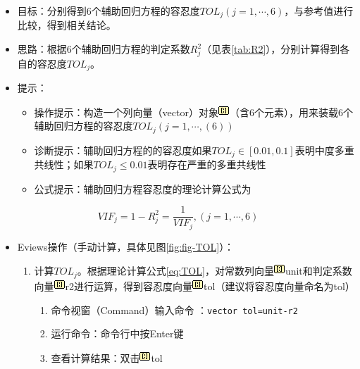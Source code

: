\documentclass[12pt,(landscape,a4paper),(portrait,a4paper)]{article}
\providecommand{\tightlist}{%
  \setlength{\itemsep}{0pt}\setlength{\parskip}{0pt}}
\begin{document}
\begin{itemize}
\tightlist
\item
  目标：分别得到6个辅助回归方程的容忍度\(TOL_j(j=1,\cdots,6)\)，与参考值进行比较，得到相关结论。\\
\item
  思路：根据6个辅助回归方程的判定系数\(R^2_j\)（见表\ref{tab:R2}），分别计算得到各自的容忍度\(TOL_j\)。\\
\item
  提示：

  \begin{itemize}
  \tightlist
  \item
    操作提示：构造一个列向量（vector）对象\includegraphics{picture/object/Vector.png}（含6个元素），用来装载6个辅助回归方程的容忍度\(TOL_j(j=1,\cdots,(6))\)
  \item
    诊断提示：辅助回归方程的的容忍度如果\(TOL_j\in[0.01,0.1]\)表明中度多重共线性；如果\(TOL_j\leq{0.01}\)表明存在严重的多重共线性
  \item
    公式提示：辅助回归方程容忍度的理论计算公式为
  \end{itemize}
\end{itemize}

\begin{equation}
VIF_j=1-R^2_j=\frac{1}{VIF_j},(j=1,\cdots,6) 
\label{eq:TOL}
\end{equation}

\begin{itemize}
\tightlist
\item
  Eviews操作（手动计算，具体见图\ref{fig:fig-TOL}）：

  \begin{enumerate}
  \def\labelenumi{\arabic{enumi})}
  \tightlist
  \item
    计算\(TOL_j\)。根据理论计算公式\eqref{eq:TOL}，对常数列向量\includegraphics{picture/object/Vector.png}unit和判定系数向量\includegraphics{picture/object/Vector.png}r2进行运算，得到容忍度向量\includegraphics{picture/object/Vector.png}tol（建议将容忍度向量命名为tol）

    \begin{enumerate}
    \def\labelenumii{\alph{enumii}.}
    \tightlist
    \item
      命令视窗（Command）输入命令 ：\texttt{vector\ tol=unit-r2}
    \item
      运行命令：命令行中按Enter键
    \item
      查看计算结果：双击\includegraphics{picture/object/Vector.png}tol
    \end{enumerate}
  \end{enumerate}
\end{itemize}
\end{document}

